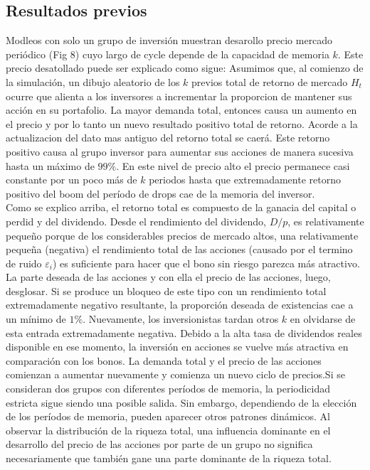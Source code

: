 \documentclass[12pt,a4paper]{article}
\begin{document}
\subsection*{Resultados previos}
\quad Modleos con solo un grupo de inversión muestran desarollo precio mercado periódico (Fig 8) cuyo largo de cycle depende de la capacidad de memoria $k$. Este precio desatollado puede ser explicado como sigue: Asumimos que, al comienzo  de la simulación, un dibujo aleatorio de los $k$ previos total de retorno de mercado $H_t$ ocurre que alienta a los inversores a incrementar la proporcion de mantener sus acción en su portafolio. La mayor demanda total, entonces causa un aumento en el precio y por lo tanto un nuevo resultado positivo total de retorno. Acorde a la actualizacion del dato mas antiguo del retorno total se caerá. Este retorno positivo causa al grupo inversor para aumentar sus acciones de manera sucesiva hasta un máximo de $99\%$. En este nivel de precio alto el precio permanece casi constante por un poco más de $k$ periodos hasta que extremadamente retorno positivo del boom del período de drops cae de la memoria del inversor.\\
\quad Como se explico arriba, el retorno total es compuesto de la ganacia del capital o perdid y del dividendo. Desde el rendimiento del dividendo, $D/p$, es relativamente pequeño porque de los considerables precios de mercado altos, una relativamente pequeña (negativa) el rendimiento total de las acciones (causado por el termino de ruido $\varepsilon_i$) es suficiente para hacer que el bono sin riesgo parezca más atractivo. La parte deseada de las acciones y con ella el precio de las acciones, luego, desglosar. Si  se produce un bloqueo de este tipo con un rendimiento total extremadamente negativo resultante, la proporción deseada de existencias cae a un mínimo de $1\%$. Nuevamente, los inversionistas tardan otros $ k $ en olvidarse de esta entrada extremadamente negativa. Debido a la alta tasa de dividendos reales disponible en ese momento, la inversión en acciones se vuelve más atractiva en comparación con los bonos. La demanda total y el precio de las acciones comienzan a aumentar nuevamente y comienza un nuevo ciclo de precios.Si se consideran dos grupos con diferentes períodos de memoria, la periodicidad estricta sigue siendo una posible salida. Sin embargo, dependiendo de la elección de los períodos de memoria, pueden aparecer otros patrones dinámicos. Al observar la distribución de la riqueza total, una influencia dominante en el desarrollo del precio de las acciones por parte de un grupo no significa necesariamente que también gane una parte dominante de la riqueza total.\\
\end{document}
